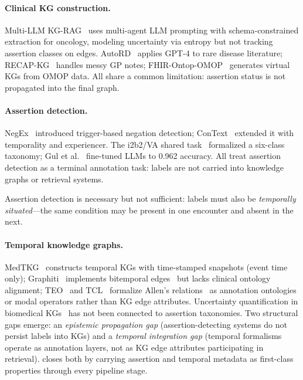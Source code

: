 \paragraph{Clinical KG construction.}
Multi-LLM KG-RAG~\cite{chen2026multilllmkgrag} uses multi-agent LLM prompting with schema-constrained extraction for oncology, modeling uncertainty via entropy but not tracking assertion classes on edges.
AutoRD~\cite{li2024autord} applies GPT-4 to rare disease literature; RECAP-KG~\cite{remy2024recapkg} handles messy GP notes; FHIR-Ontop-OMOP~\cite{yun2022fhirontopomop} generates virtual KGs from OMOP data.
All share a common limitation: assertion status is not propagated into the final graph.

\paragraph{Assertion detection.}
NegEx~\cite{chapman2001negex} introduced trigger-based negation detection; ConText~\cite{harkema2009context} extended it with temporality and experiencer.
The i2b2/VA shared task~\cite{uzuner2011i2b2assertion} formalized a six-class taxonomy; Gul et al.~\cite{gul2025beyondnegation} fine-tuned LLMs to 0.962 accuracy.
All treat assertion detection as a terminal annotation task: labels are not carried into knowledge graphs or retrieval systems.

Assertion detection is necessary but not sufficient: labels must also be \emph{temporally situated}---the same condition may be present in one encounter and absent in the next.

\paragraph{Temporal knowledge graphs.}
MedTKG~\cite{huang2024medtkg} constructs temporal KGs with time-stamped snapshots (event time only); Graphiti~\cite{ramirez2025graphiti} implements bitemporal edges~\cite{snodgrass2000temporal} but lacks clinical ontology alignment; TEO~\cite{li2020teo} and TCL~\cite{ong2023tcl} formalize Allen's relations~\cite{allen1983temporal} as annotation ontologies or modal operators rather than KG edge attributes.
Uncertainty quantification in biomedical KGs~\cite{bao2024uncertaintybiomedkg} has not been connected to assertion taxonomies.
Two structural gaps emerge: an \emph{epistemic propagation gap} (assertion-detecting systems do not persist labels into KGs) and a \emph{temporal integration gap} (temporal formalisms operate as annotation layers, not as KG edge attributes participating in retrieval).
\epikg closes both by carrying assertion and temporal metadata as first-class properties through every pipeline stage.
